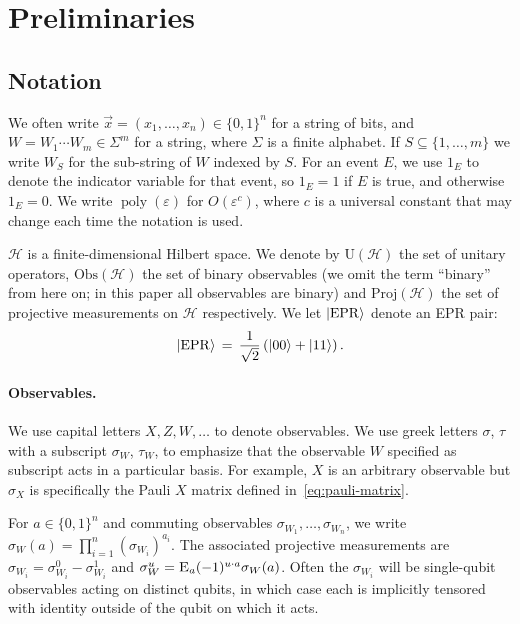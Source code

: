 \documentclass[11pt]{article}
\theoremstyle{remark}
\theoremstyle{definition}
\newcommand{\ket}[1]{|#1\rangle}
\newcommand{\Es}[1]{\ensuremath{\mathop{\textsc{E}}}_{#1}}
\newcommand{\setft}[1]{\mathrm{#1}}
\newcommand{\Proj}{\setft{Proj}}
\newcommand{\Obs}{\setft{Obs}}
\newcommand{\Unitary}{\setft{U}}
\DeclareMathOperator{\poly}{poly}
\newcommand{\mH}{\mathcal{H}}
\newcommand{\eps}{\varepsilon}
\newcommand{\EPR}{{\rm EPR}}
\begin{document}
\section{Preliminaries}\label{sec:prelim}


\subsection{Notation}
\label{sec:prelim-notation}

We often write $\vec{x} =(x_1,\ldots,x_n)\in \{0,1\}^n$ for a string of bits, and $W=W_1\cdots W_m\in\Sigma^m$ for a string, where $\Sigma$ is a finite alphabet. If $S\subseteq \{1,\ldots,m\}$ we write $W_S$ for the sub-string of $W$ indexed by $S$. For an event $E$, we use $1_{E}$ to denote the indicator variable for that event, so $1_E=1$ if $E$ is true, and otherwise $1_E=0$. We write $\poly(\eps)$ for $O(\eps^c)$, where $c$ is a universal constant that may change each time the notation is used. 

$\mH$ is a finite-dimensional Hilbert space.  We denote by $\Unitary(\mH)$ the set of unitary operators, $\Obs(\mH)$ the set of binary observables (we omit the term ``binary'' from here on; in this paper all observables are binary) and $\Proj(\mH)$ the set of projective measurements on $\mH$ respectively.  
We let $\ket{\EPR}$ denote an EPR pair: 
$$\ket{\EPR}\,=\,\frac{1}{\sqrt{2}}\left(\ket{00}+\ket{11}\right).$$


\paragraph{Observables.}
We use capital letters $X,Z,W,\ldots$ to denote observables. We use greek letters $\sigma$, $\tau$ with a subscript $\sigma_W$, $\tau_W$, to emphasize that the observable $W$ specified as subscript acts in a particular basis. For example, $X$ is an arbitrary observable but $\sigma_X$ is specifically the Pauli $X$ matrix defined in~\eqref{eq:pauli-matrix}.

For $a\in\{0,1\}^n$ and commuting observables $\sigma_{W_1},\ldots,\sigma_{W_n}$, we write $\sigma_W(a) = \prod_{i=1}^n (\sigma_{W_i})^{a_i}$. The associated projective measurements are $\sigma_{W_i} = \sigma_{W_i}^0 - \sigma_{W_i}^1$ and $\sigma_W^u = \Es{a} (-1)^{u\cdot a} \sigma_W(a)$.  Often the $\sigma_{W_i}$ will be single-qubit observables acting on distinct qubits, in which case each is implicitly tensored with identity outside of the qubit on which it acts. 
\end{document}
